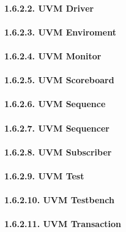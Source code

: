 \documentclass[
]{article}
\begin{document}
\hypertarget{uvm-driver}{%
\paragraph{1.6.2.2. UVM Driver}\label{uvm-driver}}

\hypertarget{uvm-enviroment}{%
\paragraph{1.6.2.3. UVM Enviroment}\label{uvm-enviroment}}

\hypertarget{uvm-monitor}{%
\paragraph{1.6.2.4. UVM Monitor}\label{uvm-monitor}}

\hypertarget{uvm-scoreboard}{%
\paragraph{1.6.2.5. UVM Scoreboard}\label{uvm-scoreboard}}

\hypertarget{uvm-sequence}{%
\paragraph{1.6.2.6. UVM Sequence}\label{uvm-sequence}}

\hypertarget{uvm-sequencer}{%
\paragraph{1.6.2.7. UVM Sequencer}\label{uvm-sequencer}}

\hypertarget{uvm-subscriber}{%
\paragraph{1.6.2.8. UVM Subscriber}\label{uvm-subscriber}}

\hypertarget{uvm-test}{%
\paragraph{1.6.2.9. UVM Test}\label{uvm-test}}

\hypertarget{uvm-testbench}{%
\paragraph{1.6.2.10. UVM Testbench}\label{uvm-testbench}}

\hypertarget{uvm-transaction}{%
\paragraph{1.6.2.11. UVM Transaction}\label{uvm-transaction}}
\end{document}

